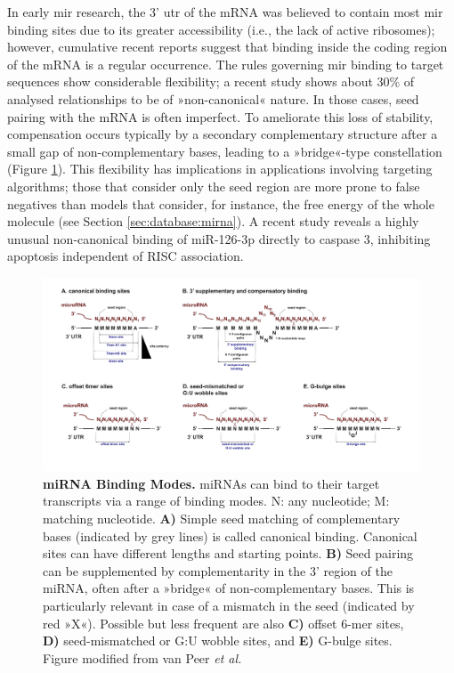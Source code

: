 In early \ac{mir} research, the 3' \ac{utr} of the mRNA was believed to contain most \ac{mir} binding sites due to its greater accessibility (i.e., the lack of active ribosomes); however, cumulative recent reports suggest that binding inside the coding region of the mRNA is a regular occurrence.\cite{Hausser2013} The rules governing \ac{mir} binding to target sequences show considerable flexibility; a recent study shows about 30\% of analysed relationships to be of »non-canonical« nature.\cite{VanPeer2018} In those cases, seed pairing with the mRNA is often imperfect. To ameliorate this loss of stability, compensation occurs typically by a secondary complementary structure after a small gap of non-complementary bases, leading to a »bridge«-type constellation (Figure \ref{fig:vanpeer2018-mirna-binding}). This flexibility has implications in applications involving targeting algorithms; those that consider only the seed region are more prone to false negatives than models that consider, for instance, the free energy of the whole molecule (see Section \ref{sec:database:mirna}). A recent study reveals a highly unusual non-canonical binding of miR-126-3p directly to caspase 3, inhibiting apoptosis independent of RISC association.\cite{Santovito2020}

\begin{figure}
\includegraphics[width=\textwidth]{figures/vanpeer2018-mirna-binding}
\caption[miRNA Binding Modes.]{\textbf{miRNA Binding Modes.} miRNAs can bind to their target transcripts via a range of binding modes. N: any nucleotide; M: matching nucleotide. \textbf{A)} Simple seed matching of complementary bases (indicated by grey lines) is called canonical binding. Canonical sites can have different lengths and starting points. \textbf{B)} Seed pairing can be supplemented by complementarity in the 3' region of the miRNA, often after a »bridge« of non-complementary bases. This is particularly relevant in case of a mismatch in the seed (indicated by red »X«). Possible but less frequent are also \textbf{C)} offset 6-mer sites, \textbf{D)} seed-mismatched or G:U wobble sites, and \textbf{E)} G-bulge sites. Figure modified from van Peer \emph{et al.}\cite{VanPeer2018}
\label{fig:vanpeer2018-mirna-binding}}
\end{figure}


